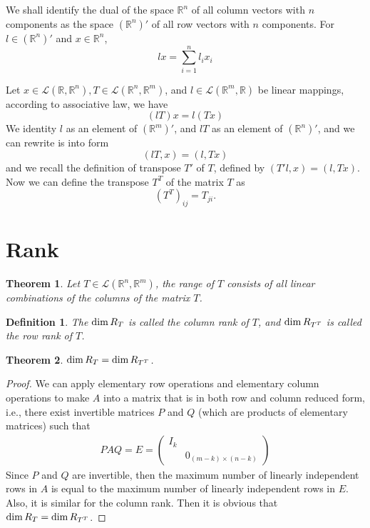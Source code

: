 \documentclass[11pt]{book}
\newtheorem{definition}{Definition}[section]
\newtheorem{theorem}{Theorem}[section]
\theoremstyle{definition}
\numberwithin{equation}{subsection}
\begin{document}
We shall identify the dual of the space $\mathbb{R}^n$ of all column vectors with $n$ components as the space $(\mathbb{R}^n)'$ of all row vectors with $n$ components. For $l\in (\mathbb{R}^n)'$ and $x\in\mathbb{R}^n$, 
$$l x = \sum^n_{i=1}l_ix_i$$

Let $x\in\mathscr{L}(\mathbb{R},\mathbb{R}^n), T \in \mathscr{L}(\mathbb{R}^n,\mathbb{R}^m)$, and $l \in \mathscr{L}(\mathbb{R}^m,\mathbb{R})$ be linear mappings, according to associative law, we have
$$(lT)x = l(Tx)$$
We identity $l$ as an element of $(\mathbb{R}^m)'$, and $lT$ as an element of $(\mathbb{R}^n)'$, and we can rewrite is into form
$$(lT, x) = (l, Tx)$$
and we recall the definition of transpose $T'$ of $T$, defined by $(T'l, x) = (l, Tx)$. Now we can define the transpose $T^T$ of the matrix $T$ as 
$$\left(T^T\right)_{ij} = T_{ji}.$$

\medskip

\section{Rank}
\begin{theorem}
Let $T\in\mathscr{L}(\mathbb{R}^n,\mathbb{R}^m)$, the range of $T$ consists of all linear combinations of the columns of the matrix $T$.
\end{theorem}

\medskip

\begin{definition}
The ${\rm dim}\, R_T$ is called the column rank of $T$, and ${\rm dim}\, R_{T^T}$ is called the row rank of $T$.
\end{definition}

\begin{theorem}
${\rm dim}\,R_T = {\rm dim}\, R_{T^T}$.
\end{theorem}
\begin{proof}
We can apply elementary row operations and elementary column operations to make $A$ into a matrix that is in both row and column reduced form, i.e., there exist invertible matrices $P$ and $Q$ (which are products of elementary matrices) such that
\begin{align*}
    PAQ = E = \left(
        \begin{matrix}
        I_{k} &  \\
         & 0_{(m-k)\times (n-k)}
        \end{matrix}
    \right)
\end{align*}
Since $P$ and $Q$ are invertible, then the maximum number of linearly independent rows in $A$ is equal to the maximum number of linearly independent rows in $E$. Also, it is similar for the column rank. Then it is obvious that ${\rm dim}\,R_T = {\rm dim}\, R_{T^T}$.
\end{proof}
\end{document}
